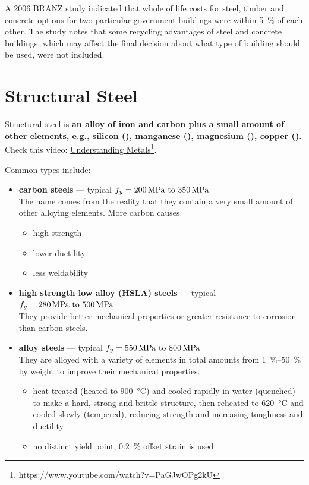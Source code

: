 A 2006 BRANZ study indicated that whole of life costs for steel, timber and concrete options for two particular government buildings were within \SI{5}{\percent} of each other.
The study notes that some recycling advantages of steel and concrete buildings, which may affect the final decision about what type of building should be used, were not included.
\section{Structural Steel}
Structural steel is \textbf{an alloy of iron and carbon plus a small amount of other elements, e.g., silicon (), manganese (), magnesium (), copper ().}
Check this video: \href{https://www.youtube.com/watch?v=PaGJwOPg2kU}{Understanding Metals}\footnote{https://www.youtube.com/watch?v=PaGJwOPg2kU}.

Common types include:
\begin{itemize}
\item \textbf{carbon steels} --- typical $f_y=\qtyrange{200}{350}{\mpa}$\\
The name comes from the reality that they contain a very small amount of other alloying elements.
More carbon causes
\begin{itemize}
\item high strength
\item lower ductility
\item less weldability
\end{itemize}
\item \textbf{high strength low alloy (HSLA) steels} --- typical $f_y=\qtyrange{280}{500}{\mpa}$\\
They provide better mechanical properties or greater resistance to corrosion than carbon steels.
\item \textbf{alloy steels} --- typical $f_y=\qtyrange{550}{800}{\mpa}$\\
They are alloyed with a variety of elements in total amounts from \SIrange{1}{50}{\percent} by weight to improve their mechanical properties.
\begin{itemize}
\item heat treated (heated to \SI{900}{\celsius}) and cooled rapidly in water (quenched) to make a hard, strong and brittle structure, then reheated to \SI{620}{\celsius} and cooled slowly (tempered), reducing strength and increasing toughness and ductility
\item no distinct yield point, \SI{0.2}{\percent} offset strain is used
\end{itemize}
\end{itemize}
